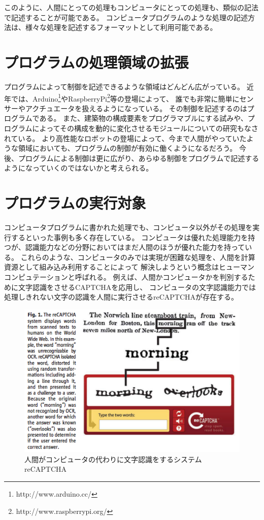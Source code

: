 このように、人間にとっての処理もコンピュータにとっての処理も、類似の記法で記述することが可能である。
コンピュータプログラムのような処理の記述方法は、様々な処理を記述するフォーマットとして利用可能である。

\section{プログラムの処理領域の拡張}\label{ux30d7ux30edux30b0ux30e9ux30e0ux306eux51e6ux7406ux9818ux57dfux306eux62e1ux5f35}

プログラムによって制御を記述できるような領域はどんどん広がっている。
近年では、Arduino\footnote{http://www.arduino.cc/}やRaspberryPi\footnote{http://www.raspberrypi.org/}等の登場によって、
誰でも非常に簡単にセンサーやアクチュエータを扱えるようになっている。
その制御を記述するのはプログラムである。
また、建築物の構成要素をプログラマブルにする試み\cite{squama}や、プログラムによってその構成を動的に変化させるモジュールについての研究もなされている。
より高性能なロボットの登場によって、今まで人間がやっていたような領域においても、プログラムの制御が有効に働くようになるだろう。
今後、プログラムによる制御は更に広がり、あらゆる制御をプログラムで記述するようになっていくのではないかと考えられる。

\section{プログラムの実行対象}\label{ux30d7ux30edux30b0ux30e9ux30e0ux306eux5b9fux884cux5bfeux8c61}

コンピュータプログラムに書かれた処理でも、コンピュータ以外がその処理を実行するといった事例も多く存在している。
コンピュータは優れた処理能力を持つが、認識能力などの分野においてはまだ人間のほうが優れた能力を持っている。
これらのような、コンピュータのみでは実現が困難な処理を、人間を計算資源として組み込み利用することによって
解決しようという概念はヒューマンコンピュテーション\cite{humancomputation}と呼ばれる。
例えば、人間かコンピュータかを判別するために文字認識をさせるCAPTCHA\cite{captcha}を応用し、
コンピュータの文字認識能力では処理しきれない文字の認識を人間に実行させるreCAPTCHA\cite{recaptcha}が存在する。

\begin{figure}[htbp]
  \begin{center}
  \includegraphics[width=.5\linewidth,bb=0 0 476 316]{images/recaptcha.png}
  \end{center}
  \caption{人間がコンピュータの代わりに文字認識をするシステム reCAPTCHA}
  \label{fig:recaptcha}
\end{figure}

